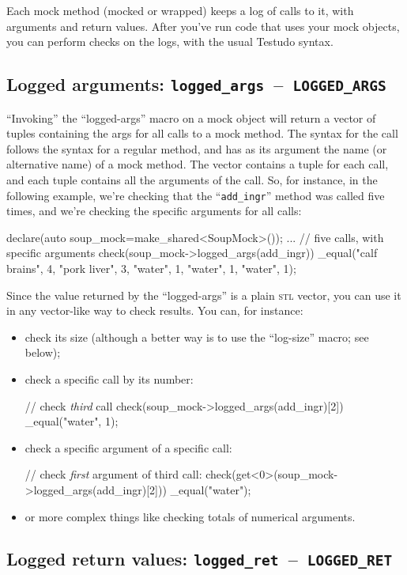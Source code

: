 \documentclass[twoside, a4paper, article]{memoir}
\newcommand*\testudocolor{\color{red!80!blue}}
\newcommand*\testudo[1]{\texttt{\testudocolor{}#1}}
\newcommand*\testudopair[2]{\testudo{#1}~--~\testudo{#2}}
\newcommand\subsectiontestudopair[3]{%
  \subsection[#1]{#1: \testudopair{#2}{#3}}}
\begin{document}
Each mock method (mocked or wrapped) keeps a log of calls to it, with arguments
and return values.  After you've run code that uses your mock objects, you can
perform checks on the logs, with the usual Testudo syntax.

\subsectiontestudopair{Logged arguments}{logged\_args}{LOGGED\_ARGS}

``Invoking'' the ``logged-args'' macro on a mock object will return a vector of
tuples containing the args for all calls to a mock method.  The syntax for the
call follows the syntax for a regular method, and has as its argument the name
(or alternative name) of a mock method.  The vector contains a tuple for each
call, and each tuple contains all the arguments of the call.  So, for instance,
in the following example, we're checking that the ``\texttt{add\_ingr}'' method
was called five times, and we're checking the specific arguments for all calls:
\begin{cpplisting}
declare(auto soup_mock=make_shared<SoupMock>());
...
// five calls, with specific arguments
check(soup_mock->logged_args(add_ingr))
  _equal({{"calf brains", 4},
          {"pork liver", 3},
          {"water", 1},
          {"water", 1},
          {"water", 1}});
\end{cpplisting}

Since the value returned by the ``logged-args'' is a plain \textsc{stl} vector,
you can use it in any vector-like way to check results.  You can, for instance:
\begin{itemize}
\item check its size (although a better way is to use the ``log-size'' macro;
  see below);
\item check a specific call by its number:
\begin{cpplisting}
// check \emph{third} call
check(soup_mock->logged_args(add_ingr)[2])
  _equal({"water", 1});
\end{cpplisting}
\item check a specific argument of a specific call:
\begin{cpplisting}
// check \emph{first} argument of third call:
check(get<0>(soup_mock->logged_args(add_ingr)[2]))
  _equal("water");
\end{cpplisting}
\item or more complex things like checking totals of numerical arguments.
\end{itemize}

\subsectiontestudopair{Logged return values}{logged\_ret}{LOGGED\_RET}
\end{document}
